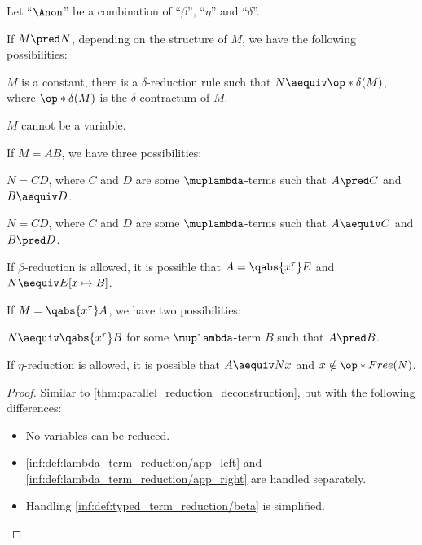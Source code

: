 \begin{lemma}\label{thm:single_step_reduction_deconstruction}
  Let \enquote{\( {\Anon} \)} be a combination of \enquote{\( \beta \)}, \enquote{\( \eta \)} and \enquote{\( \delta \)}.

  If \( M \pred N \), depending on the structure of \( M \), we have the following possibilities:
  \begin{thmenum}
     \( M \) is a constant, there is a \( \delta \)-reduction rule such that \( N \aequiv \op*{\delta}(M) \), where \( \op*{\delta}(M) \) is the \( \delta \)-contractum of \( M \).

     \( M \) cannot be a variable.

     If \( M = AB \), we have three possibilities:
    \begin{thmenum}
       \( N = CD \), where \( C \) and \( D \) are some \( \muplambda \)-terms such that \( A \pred C \) and \( B \aequiv D \).

       \( N = CD \), where \( C \) and \( D \) are some \( \muplambda \)-terms such that \( A \aequiv C \) and \( B \pred D \).

       If \( \beta \)-reduction is allowed, it is possible that \( A = \qabs {x^\tau} E \) and \( N \aequiv E[x \mapsto B] \).
    \end{thmenum}

     If \( M = \qabs {x^\tau} A \), we have two possibilities:
    \begin{thmenum}
       \( N \aequiv \qabs {x^\tau} B \) for some \( \muplambda \)-term \( B \) such that \( A \pred B \).

       If \( \eta \)-reduction is allowed, it is possible that \( A \aequiv Nx \) and \( x \notin \op*{Free}(N) \).
    \end{thmenum}
  \end{thmenum}
\end{lemma}
\begin{proof}
  Similar to \cref{thm:parallel_reduction_deconstruction}, but with the following differences:
  \begin{itemize}
    \item No variables can be reduced.
    \item \ref{inf:def:lambda_term_reduction/app_left} and \ref{inf:def:lambda_term_reduction/app_right} are handled separately.
    \item Handling \ref{inf:def:typed_term_reduction/beta} is simplified.
  \end{itemize}
\end{proof}

